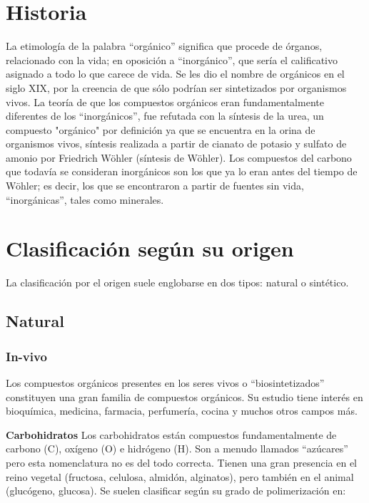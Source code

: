 \documentclass[12pt,letterpaper]{article}
\begin{document}
\section{Historia}

La etimología de la palabra ``orgánico'' significa que procede de órganos, relacionado con la vida; en oposición a ``inorgánico'', que sería el calificativo asignado a todo lo que carece de vida. Se les dio el nombre de orgánicos en el siglo XIX, por la creencia de que sólo podrían ser sintetizados por organismos vivos. La teoría de que los compuestos orgánicos eran fundamentalmente diferentes de los ``inorgánicos'', fue refutada con la síntesis de la urea, un compuesto "orgánico" por definición ya que se encuentra en la orina de organismos vivos, síntesis realizada a partir de cianato de potasio y sulfato de amonio por Friedrich Wöhler (síntesis de Wöhler). Los compuestos del carbono que todavía se consideran inorgánicos son los que ya lo eran antes del tiempo de Wöhler; es decir, los que se encontraron a partir de fuentes sin vida, ``inorgánicas'', tales como minerales.

\section{Clasificación según su origen}

La clasificación por el origen suele englobarse en dos tipos: natural o sintético.

\subsection{Natural}

\subsubsection{In-vivo}

Los compuestos orgánicos presentes en los seres vivos o ``biosintetizados'' constituyen una gran familia de compuestos orgánicos. Su estudio tiene interés en bioquímica, medicina, farmacia, perfumería, cocina y muchos otros campos más.

\noindent \textbf{Carbohidratos} \quad Los carbohidratos están compuestos fundamentalmente de carbono (C), oxígeno (O) e hidrógeno (H). Son a menudo llamados ``azúcares'' pero esta nomenclatura no es del todo correcta. Tienen una gran presencia en el reino vegetal (fructosa, celulosa, almidón, alginatos), pero también en el animal (glucógeno, glucosa). Se suelen clasificar según su grado de polimerización en:
\end{document}
